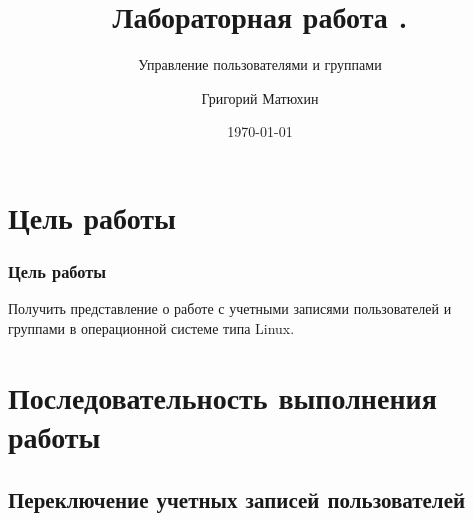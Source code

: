 \documentclass{beamer}
\author{Григорий Матюхин}
\date{\today}
\title{Лабораторная работа \textnumero2.}
\subtitle{Управление пользователями и группами}
\begin{document}
  \begin{frame}[plain]
  \titlepage
  \end{frame}
  \section{Цель работы}
  \begin{frame}[plain]
  \frametitle{Цель работы}
    Получить представление о работе с учетными записями пользователей и группами в операционной системе типа Linux.
  \end{frame}
  \section{Последовательность выполнения работы}
    \subsection{Переключение учетных записей пользователей}
\end{document}
